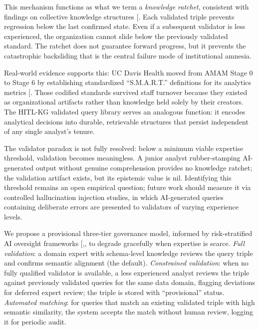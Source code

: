 \documentclass[
  american,
  11pt,
  letterpaper,
  oneside  ,captions=tableheading
]{scrartcl}
\begin{document}
This mechanism functions as what we term a \emph{knowledge ratchet},
consistent with findings on collective knowledge structures
{[}\citeproc{ref-rao2006}{13}{]}. Each validated triple prevents
regression below the last confirmed state. Even if a subsequent
validator is less experienced, the organization cannot slide below the
previously validated standard. The ratchet does not guarantee forward
progress, but it prevents the catastrophic backsliding that is the
central failure mode of institutional amnesia.

Real-world evidence supports this: UC Davis Health moved from AMAM Stage
0 to Stage 6 by establishing standardized ``S.M.A.R.T.'' definitions for
its analytics metrics {[}\citeproc{ref-himss2025ucdavis}{72}{]}. Those
codified standards survived staff turnover because they existed as
organizational artifacts rather than knowledge held solely by their
creators. The HITL-KG validated query library serves an analogous
function: it encodes analytical decisions into durable, retrievable
structures that persist independent of any single analyst's tenure.

The validator paradox is not fully resolved: below a minimum viable
expertise threshold, validation becomes meaningless. A junior analyst
rubber-stamping AI-generated output without genuine comprehension
provides no knowledge ratchet; the validation artifact exists, but its
epistemic value is nil. Identifying this threshold remains an open
empirical question; future work should measure it via controlled
hallucination injection studies, in which AI-generated queries
containing deliberate errors are presented to validators of varying
experience levels.

We propose a provisional three-tier governance model, informed by
risk-stratified AI oversight frameworks
{[},\citeproc{ref-labkoff2024}{74}{]},
to degrade gracefully when expertise is scarce. \emph{Full validation}:
a domain expert with schema-level knowledge reviews the query triple and
confirms semantic alignment (the default). \emph{Constrained
validation}: when no fully qualified validator is available, a less
experienced analyst reviews the triple against previously validated
queries for the same data domain, flagging deviations for deferred
expert review; the triple is stored with ``provisional'' status.
\emph{Automated matching}: for queries that match an existing validated
triple with high semantic similarity, the system accepts the match
without human review, logging it for periodic audit.
\end{document}
